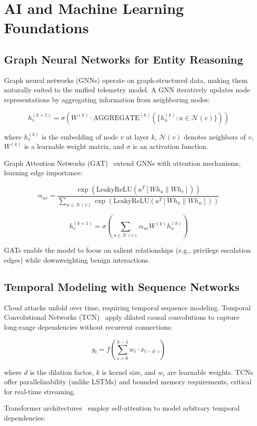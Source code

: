 \section{AI and Machine Learning Foundations}\label{sec:theory-ai}
\subsection{Graph Neural Networks for Entity Reasoning}
Graph neural networks (GNNs) operate on graph-structured data, making them naturally suited to the unified telemetry model. A GNN iteratively updates node representations by aggregating information from neighboring nodes:

$$h_v^{(k+1)} = \sigma\left( W^{(k)} \cdot \text{AGGREGATE}^{(k)}\left(\{h_u^{(k)} : u \in \mathcal{N}(v)\}\right) \right)$$

where $h_v^{(k)}$ is the embedding of node $v$ at layer $k$, $\mathcal{N}(v)$ denotes neighbors of $v$, $W^{(k)}$ is a learnable weight matrix, and $\sigma$ is an activation function.

Graph Attention Networks (GAT)~\cite{velickovic2017gat} extend GNNs with attention mechanisms, learning edge importance:

$$\alpha_{uv} = \frac{\exp(\text{LeakyReLU}(a^T [W h_u \| W h_v]))}{\sum_{w \in \mathcal{N}(v)} \exp(\text{LeakyReLU}(a^T [W h_u \| W h_w]))}$$

$$h_v^{(k+1)} = \sigma\left(\sum_{u \in \mathcal{N}(v)} \alpha_{uv} W^{(k)} h_u^{(k)}\right)$$

GATs enable the model to focus on salient relationships (e.g., privilege escalation edges) while downweighting benign interactions.

\subsection{Temporal Modeling with Sequence Networks}
Cloud attacks unfold over time, requiring temporal sequence modeling. Temporal Convolutional Networks (TCN)~\cite{bai2018tconvnet} apply dilated causal convolutions to capture long-range dependencies without recurrent connections:

$$y_t = f\left(\sum_{i=0}^{k-1} w_i \cdot x_{t - d \cdot i}\right)$$

where $d$ is the dilation factor, $k$ is kernel size, and $w_i$ are learnable weights. TCNs offer parallelizability (unlike LSTMs) and bounded memory requirements, critical for real-time streaming.

Transformer architectures~\cite{vaswani2017attention} employ self-attention to model arbitrary temporal dependencies:


